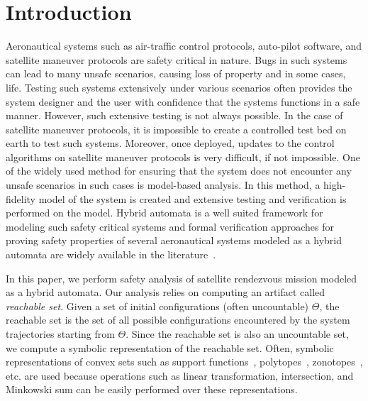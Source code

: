 \section{Introduction}
\label{sec:intro}

Aeronautical systems such as air-traffic control protocols, auto-pilot software, and satellite maneuver protocols are safety critical in nature.
%
Bugs in such systems can lead to many unsafe scenarios, causing loss of property and in some cases, life.
%
Testing such systems extensively under various scenarios often provides the system designer and the user with confidence that the systems functions in a safe manner.
%
However, such extensive testing is not always possible. 
%
%
In the case of satellite maneuver protocols, it is impossible to create a controlled test bed on earth to test such systems.
%
Moreover, once deployed, updates to the control algorithms on satellite maneuver protocols is very difficult, if not impossible.
%
%
One of the widely used method for ensuring that the system does not encounter any unsafe scenarios in such cases is model-based analysis.
%
In this method, a high-fidelity model of the system is created and extensive testing and verification is performed on the model.
%
%
% 
% 
Hybrid automata is a well suited framework for modeling such safety critical systems and formal verification approaches for proving safety properties of several aeronautical systems modeled as a hybrid automata are widely available in the literature~\cite{tomlin1998conflict,pallottino2002conflict,prabhakar2009verifying,johnson2012satellite,munoz2013tcas,zhao2014formal,duggirala2014temporal,jeannin2015formally}.
%
%
%
%

In this paper, we perform safety analysis of satellite rendezvous mission modeled as a hybrid automata.
%
Our analysis relies on computing an artifact called {\em reachable set}. 
%
Given a set of initial configurations (often uncountable) $\Theta$, the reachable set is the set of all possible configurations encountered by the system trajectories starting from $\Theta$. 
%
Since the reachable set is also an uncountable set, we compute a symbolic representation of the reachable set.
%
Often, symbolic representations of convex sets such as support functions~\cite{spaceex}, polytopes~\cite{Frehse05_phaver}, zonotopes~\cite{girard2006efficient}, etc. are used because operations such as linear transformation, intersection, and Minkowski sum can be easily performed over these representations.
%


